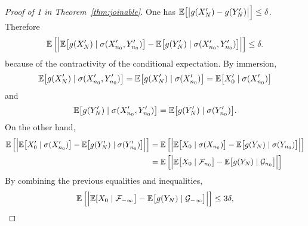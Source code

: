 \documentclass[12pt,a4paper]{article}
\begin{document}
\begin{proof}[Proof of 1 in Theorem~\ref{thm:joinable}]
One has $\mathbb{E}\bigl[\bigl|g(X'_N) - g(Y'_N)\bigr|\Bigr] \leq \delta$. Therefore 
$$
\mathbb{E}\left[ \Bigr|\mathbb{E}\bigl[g(X'_N) \mid \sigma(X'_{n_0}, Y'_{n_0})\bigr] 
 - \mathbb{E}\bigl[g(Y'_N) \mid \sigma(X'_{n_0}, Y'_{n_0}) \bigr] \Bigl| \right] \leq \delta.
$$
because of the contractivity of the conditional expectation. 
By immersion, 
$$
\mathbb{E}\bigl[g(X'_N) \mid \sigma(X'_{n_0}, Y'_{n_0})\bigr] 
= \mathbb{E}\bigl[g(X'_N) \mid \sigma(X'_{n_0})\bigr] = \mathbb{E}\bigl[X'_0 \mid \sigma(X'_{n_0})\bigr]
$$
and 
$$
\mathbb{E}\bigl[g(Y'_N) \mid \sigma(X'_{n_0}, Y'_{n_0})\bigr] 
= \mathbb{E}\bigl[g(Y'_N) \mid \sigma(Y'_{n_0})\bigr]. 
$$
On the other hand, 
\begin{align*}
\mathbb{E}\left[ \Bigr| 
\mathbb{E}\bigl[X'_0 \mid \sigma(X'_{n_0})\bigr] 
 - \mathbb{E}\bigl[g(Y'_N) \mid \sigma(Y'_{n_0})\bigr] 
\Bigl| \right] 
& = \mathbb{E}\left[ \Bigr| 
\mathbb{E}\bigl[X_0 \mid \sigma(X_{n_0})\bigr] 
 - \mathbb{E}\bigl[g(Y_N) \mid \sigma(Y_{n_0})\bigr] 
\Bigl| \right] \\
& = \mathbb{E}\left[ \Bigr| 
\mathbb{E}\bigl[X_0 \mid \mathcal{F}_{n_0}\bigr] 
 - \mathbb{E}\bigl[g(Y_N) \mid \mathcal{G}_{n_0}\bigr] 
\Bigl| \right]
\end{align*}
By combining the previous equalities and inequalities, 
$$
\mathbb{E}\left[ \Bigr| 
\mathbb{E}[X_0 \mid \mathcal{F}_{-\infty}\bigr]  -  \mathbb{E}\bigl[g(Y_N) \mid \mathcal{G}_{-\infty}\bigr]
\Bigl| \right] 
\leq 3\delta,
$$
%
%
%
%
%
%

\end{proof}
\end{document}

